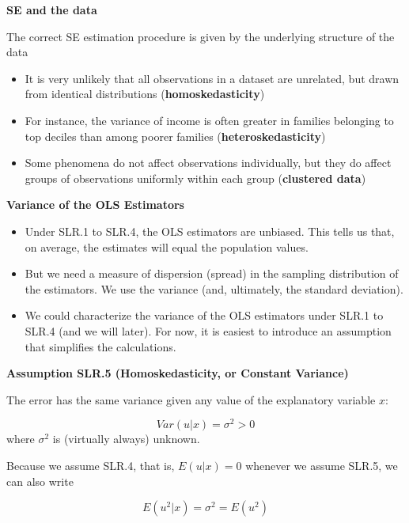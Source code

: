 \documentclass[notes=show]{beamer}
\begin{document}
\begin{frame}[plain]
\begin{center}
\textbf{SE and the data}
\end{center}

The correct SE estimation procedure is given by the underlying structure of the data
\begin{itemize}
\item It is very unlikely that all observations in a dataset are unrelated, but drawn from identical distributions (\textbf{homoskedasticity})
\item For instance, the variance of income is often greater in families belonging to top deciles than among poorer families (\textbf{heteroskedasticity})
\item Some phenomena do not affect observations individually, but they do affect groups of observations uniformly within each group (\textbf{clustered data})
\end{itemize}

\end{frame}


\begin{frame}[plain]
 \begin{center}
  \textbf{Variance of the OLS Estimators}
 \end{center}
 \begin{itemize}
  \item Under SLR.1 to SLR.4, the OLS estimators are unbiased. This tells us that, on average, the estimates will equal the population values.

  \item But we need a measure of dispersion (spread) in the sampling distribution of the estimators. We use the variance (and, ultimately, the standard deviation).
  
  \item We could characterize the variance of the OLS estimators under SLR.1 to SLR.4 (and we will later). For now, it is easiest to introduce an assumption that simplifies the calculations.
 \end{itemize}
\end{frame}


\begin{frame}[plain]

 \textbf{Assumption SLR.5 (Homoskedasticity, or Constant Variance)}

The error has the same variance given any value of the explanatory variable $x$:

 \begin{equation}
  Var(u|x)=\sigma ^{2}>0
 \end{equation}
 where $\sigma ^{2}$ is (virtually always) unknown.\linebreak

 Because we assume SLR.4, that is, $E(u|x)=0$ whenever we assume SLR.5, we can also write

 \begin{equation}
  E(u^{2}|x)=\sigma ^{2}=E(u^{2})
 \end{equation}
\end{frame}
\end{document}
